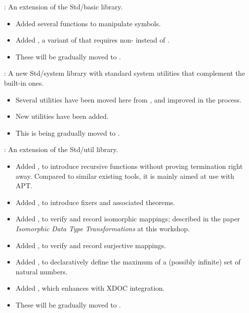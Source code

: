 
\begin{frame}

\newlibtitle

:
An extension of the Std/basic library.
\begin{itemize}
\item
Added several functions to manipulate symbols.
\item
Added , a variant of 
that requires non- instead of .
\item
These will be gradually moved to .
\end{itemize}

\separation

:
A new Std/system library
with standard system utilities
that complement the built-in ones.
\begin{itemize}
\item
Several utilities have been moved here from ,
and improved in the process.
\item
New utilities have been added.
\item
This is being gradually moved to .
\end{itemize}

\end{frame}


\begin{frame}

\newlibtitle

:
An extension of the Std/util library.
\begin{itemize}
\item
Added ,
to introduce recursive functions without proving termination right away.
Compared to similar existing tools, it is mainly aimed at use with APT.
\item
Added , to introduce fixers and associated theorems.
\item
Added , to verify and record isomorphic mappings;
described in the paper
\textit{Isomorphic Data Type Transformations} at this workshop.
\item
Added , to verify and record surjective mappings.
\item
Added ,
to declaratively define the maximum of
a (possibly infinite) set of natural numbers.
\item
Added , which enhances  with XDOC integration.
\item
These will be gradually moved to .
\end{itemize}

\end{frame}

